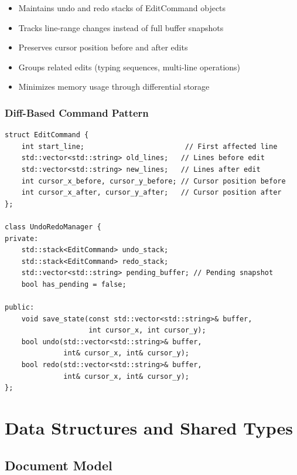 \documentclass[12pt,a4paper,oneside,openany]{report}
\begin{document}
\begin{itemize}
	\item Maintains undo and redo stacks of EditCommand objects
	\item Tracks line-range changes instead of full buffer snapshots
	\item Preserves cursor position before and after edits
	\item Groups related edits (typing sequences, multi-line operations)
	\item Minimizes memory usage through differential storage
\end{itemize}

\newpage
\subsection{Diff-Based Command Pattern}

\begin{lstlisting}
struct EditCommand {
    int start_line;                        // First affected line
    std::vector<std::string> old_lines;   // Lines before edit
    std::vector<std::string> new_lines;   // Lines after edit
    int cursor_x_before, cursor_y_before; // Cursor position before
    int cursor_x_after, cursor_y_after;   // Cursor position after
};

class UndoRedoManager {
private:
    std::stack<EditCommand> undo_stack;
    std::stack<EditCommand> redo_stack;
    std::vector<std::string> pending_buffer; // Pending snapshot
    bool has_pending = false;
    
public:
    void save_state(const std::vector<std::string>& buffer,
                    int cursor_x, int cursor_y);
    bool undo(std::vector<std::string>& buffer,
              int& cursor_x, int& cursor_y);
    bool redo(std::vector<std::string>& buffer,
              int& cursor_x, int& cursor_y);
};
\end{lstlisting}

\chapter{Data Structures and Shared Types}

\section{Document Model}
\end{document}
